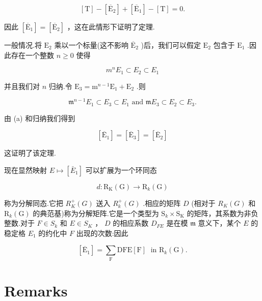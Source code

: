 \documentclass[10pt]{article}
\begin{document}
\[
\left\lbrack  \mathrm{T}\right\rbrack   - \left\lbrack  {\overline{\mathrm{E}}}_{2}\right\rbrack   + \left\lbrack  {\overline{\mathrm{E}}}_{1}\right\rbrack   - \left\lbrack  \mathrm{T}\right\rbrack   = 0.
\]

因此 \(\left\lbrack  {\overline{\mathrm{E}}}_{1}\right\rbrack   = \left\lbrack  {\overline{\mathrm{E}}}_{2}\right\rbrack\) ，这在此情形下证明了定理.

一般情况.将 \({\mathrm{E}}_{2}\) 乘以一个标量(这不影响 \({\overline{\mathrm{E}}}_{2}\) )后，我们可以假定 \({\mathrm{E}}_{2}\) 包含于 \({\mathrm{E}}_{1}\) .因此存在一个整数 \(n \geq  0\) 使得

\[
{m}^{n}{E}_{1} \subset  {E}_{2} \subset  {E}_{1}
\]

并且我们对 \(n\) 归纳.令 \({\mathrm{E}}_{3} = {\mathrm{m}}^{n - 1}{\mathrm{E}}_{1} + {\mathrm{E}}_{2}\) .则

\[
{\mathfrak{m}}^{n - 1}{E}_{1} \subset  {E}_{3} \subset  {E}_{1}\text{ and }\mathfrak{m}{E}_{3} \subset  {E}_{2} \subset  {E}_{3}.
\]

由 (a) 和归纳我们得到

\[
\left\lbrack  {\overline{\mathrm{E}}}_{1}\right\rbrack   = \left\lbrack  {\overline{\mathrm{E}}}_{3}\right\rbrack   = \left\lbrack  {\overline{\mathrm{E}}}_{2}\right\rbrack
\]

这证明了该定理.

现在显然映射 \(E \mapsto  \left\lbrack  {\bar{E}}_{1}\right\rbrack\) 可以扩展为一个环同态

\[
d : {\mathrm{R}}_{\mathrm{K}}\left( \mathrm{G}\right)  \rightarrow  {\mathrm{R}}_{k}\left( \mathrm{G}\right)
\]

称为分解同态.它把 \({R}_{K}^{ + }\left( G\right)\) 送入 \({R}_{k}^{ + }\left( G\right)\) .相应的矩阵 \(D\) (相对于 \({R}_{K}\left( G\right)\) 和 \({\mathrm{R}}_{k}\left( \mathrm{G}\right)\) 的典范基)称为分解矩阵.它是一个类型为 \({\mathrm{S}}_{k} \times  {\mathrm{S}}_{\mathrm{K}}\) 的矩阵，其系数为非负整数.对于 \(F \in  {S}_{k}\) 和 \(E \in  {S}_{K}\) ， \(D\) 的相应系数 \({D}_{FE}\) 是在模 \(\mathfrak{m}\) 意义下，某个 \(E\) 的稳定格 \({E}_{1}\) 的约化中 \(F\) 出现的次数:因此

\[
\left\lbrack  {\overline{\mathrm{E}}}_{1}\right\rbrack   = \mathop{\sum }\limits_{\mathrm{F}}\mathrm{D}\mathrm{{FE}}\left\lbrack  \mathrm{F}\right\rbrack  \;\text{ in }{\mathrm{R}}_{k}\left( \mathrm{G}\right) .
\]

\section*{Remarks}
\end{document}
